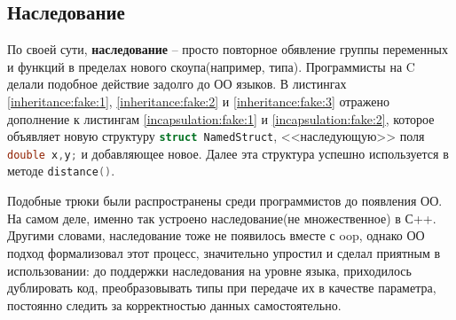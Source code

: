 \subsection{Наследование}
\label{sec:inheritance}

По своей сути, \textbf{наследование} -- просто повторное обявление группы переменных и функций в пределах нового скоупа(например, типа). Программисты на C делали подобное действие задолго до ОО языков. В листингах \ref{inheritance:fake:1}, \ref{inheritance:fake:2} и \ref{inheritance:fake:3} отражено дополнение к листингам \ref{incapsulation:fake:1} и \ref{incapsulation:fake:2}, которое объявляет новую структуру \lstinline[language=C]{struct NamedStruct}, <<наследующую>> поля \lstinline[language=C]{double x,y;} и добавляющее новое. Далее эта структура успешно используется в методе \lstinline[language=C]{distance()}.

Подобные трюки были распространены среди программистов до появления ОО. На самом деле, именно так устроено наследование(не множественное) в С++. Другими словами, наследование тоже не появилось вместе с \gls{oop}, однако ОО подход формализовал этот процесс, значительно упростил и сделал приятным в использовании: до поддержки наследования на уровне языка, приходилось дублировать код, преобразовывать типы при передаче их в качестве параметра, постоянно следить за корректностью данных самостоятельно.
